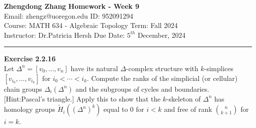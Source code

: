 \documentclass[a4paper, 12pt]{article}
\newenvironment{problem}[2][Exercise]
    { \begin{mdframed}[backgroundcolor=gray!20] \textbf{#1 #2} \\}
    {  \end{mdframed}}
\begin{document}
\noindent
\large\textbf{Zhengdong Zhang} \hfill \textbf{Homework - Week 9}   \\
Email: zhengz@uoregon.edu \hfill ID: 952091294 \\
\normalsize Course: MATH 634 - Algebraic Topology  \hfill Term: Fall 2024\\
Instructor: Dr.Patricia Hersh \hfill Due Date: $5^{th}$ December, 2024 \\
\noindent\rule{7in}{2.8pt}
\begin{problem}{2.2.16}
Let \(\Delta^n=[v_0,\ldots,v_n]\) have its natural \(\Delta\)-complex structure with \(k\)-simplices \([v_{i_0},\ldots,v_{i_k}]\) for \(i_0<\cdots<i_k\). Compute the ranks of the 
simplicial (or cellular) chain groups \(\Delta_i(\Delta^n)\) and the subgroups of cycles and boundaries. [Hint:Pascal's triangle.] Apply this to show that the \(k\)-skeleton of \(\Delta^n\) has 
homology groups \(\tilde{H}_i((\Delta^n)^k)\) equal to 0 for \(i<k\) and free of rank \(\binom{n}{k+1}\) for \(i=k\).
\end{problem}
\end{document}
